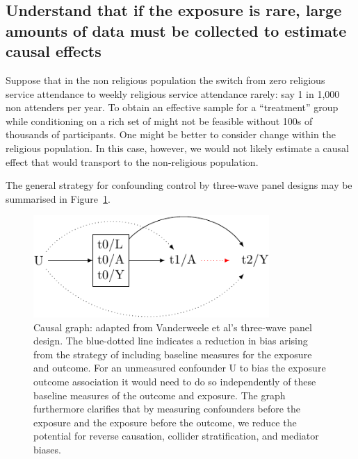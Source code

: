 \documentclass[
  singlecolumn]{report}
\begin{document}
\hypertarget{understand-that-if-the-exposure-is-rare-large-amounts-of-data-must-be-collected-to-estimate-causal-effects}{%
\subsection{\texorpdfstring{\textbf{Understand that if the exposure is
rare, large amounts of data must be collected to estimate causal
effects}}{Understand that if the exposure is rare, large amounts of data must be collected to estimate causal effects}}\label{understand-that-if-the-exposure-is-rare-large-amounts-of-data-must-be-collected-to-estimate-causal-effects}}

Suppose that in the non religious population the switch from zero
religious service attendance to weekly religious service attendance
rarely: say 1 in 1,000 non attenders per year. To obtain an effective
sample for a ``treatment'' group while conditioning on a rich set of
might not be feasible without 100s of thousands of participants. One
might be better to consider change within the religious population. In
this case, however, we would not likely estimate a causal effect that
would transport to the non-religious population.

The general strategy for confounding control by three-wave panel designs
may be summarised in Figure~\ref{fig-dag-6}.

\begin{figure}

{\centering \includegraphics[width=0.8\textwidth,height=\textheight]{causal-dags_files/figure-pdf/fig-dag-6-1.pdf}

}

\caption{\label{fig-dag-6}Causal graph: adapted from Vanderweele et al's
three-wave panel design. The blue-dotted line indicates a reduction in
bias arising from the strategy of including baseline measures for the
exposure and outcome. For an unmeasured confounder U to bias the
exposure outcome association it would need to do so independently of
these baseline measures of the outcome and exposure. The graph
furthermore clarifies that by measuring confounders before the exposure
and the exposure before the outcome, we reduce the potential for reverse
causation, collider stratification, and mediator biases.}

\end{figure}
\end{document}
